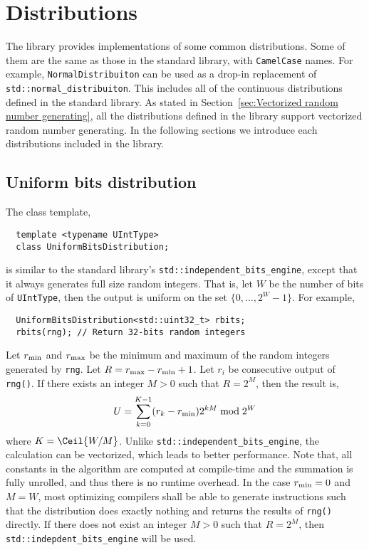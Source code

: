 \section{Distributions}
\label{sec:Distributions}

The library provides implementations of some common distributions. Some of them
are the same as those in the standard library, with \verb|CamelCase| names. For
example, \verb|NormalDistribuiton| can be used as a drop-in replacement of
\verb|std::normal_distribuiton|. This includes all of the continuous
distributions defined in the standard library. As stated in
Section~\ref{sec:Vectorized random number generating}, all the distributions
defined in the library support vectorized random number generating. In the
following sections we introduce each distributions included in the library.

\subsection{Uniform bits distribution}
\label{sub:Uniform bits distribution}

The class template,
\begin{Verbatim}
  template <typename UIntType>
  class UniformBitsDistribution;
\end{Verbatim}
is similar to the standard library's \verb|std::independent_bits_engine|,
except that it always generates full size random integers. That is, let $W$ be
the number of bits of \verb|UIntType|, then the output is uniform on the set
$\{0,\dots,2^W - 1\}$. For example,
\begin{Verbatim}
  UniformBitsDistribution<std::uint32_t> rbits;
  rbits(rng); // Return 32-bits random integers
\end{Verbatim}
Let $r_{\mathrm{min}}$ and $r_{\mathrm{max}}$ be the minimum and maximum of the random integers
generated by \verb|rng|. Let $R = r_{\mathrm{max}} - r_{\mathrm{min}} + 1$. Let $r_i$ be consecutive
output of \verb|rng()|. If there exists an integer $M > 0$ such that $R = 2^M$,
then the result is,
\begin{equation*}
  U = \sum_{k = 0}^{K - 1} (r_k - r_{\mathrm{min}}) 2^{kM} \bmod 2^W
\end{equation*}
where $K = \Ceil{W / M}$. Unlike \verb|std::independent_bits_engine|, the
calculation can be vectorized, which leads to better performance. Note that,
all constants in the algorithm are computed at compile-time and the summation
is fully unrolled, and thus there is no runtime overhead. In the case $r_{\mathrm{min}} =
0$ and $M = W$, most optimizing compilers shall be able to generate
instructions such that the distribution does exactly nothing and returns the
results of \verb|rng()| directly. If there does not exist an integer $M > 0$
such that $R = 2^M$, then \verb|std::indepdent_bits_engine| will be used.


